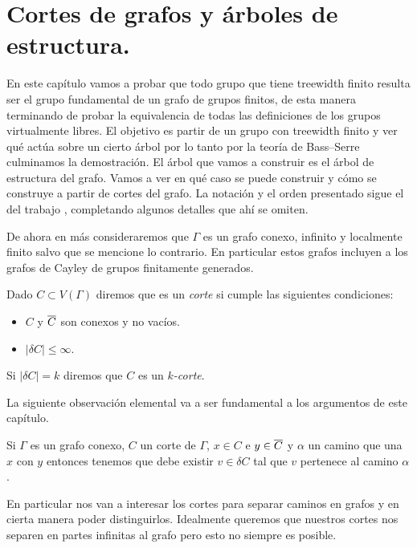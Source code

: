 \documentclass[tesis.tex]{subfiles}
\begin{document}
	
\chapter{Cortes de grafos y árboles de estructura.}

En este capítulo vamos a probar que todo grupo que tiene treewidth finito resulta ser el grupo fundamental de un grafo de grupos finitos, de esta manera terminando de probar la equivalencia de todas las definiciones de los grupos virtualmente libres.
El objetivo es partir de un grupo con treewidth finito y ver qué actúa sobre un cierto árbol por lo tanto por la teoría de Bass--Serre culminamos la demostración.
El árbol que vamos a construir es el árbol de estructura del grafo.
Vamos a ver en qué caso se puede construir y cómo se construye a partir de cortes del grafo. 
La notación y el orden presentado sigue el del trabajo \cite{diekert2013context}, completando algunos detalles que ahí se omiten.

De ahora en más consideraremos que $\Gamma$ es un grafo conexo, infinito y localmente finito salvo que se mencione lo contrario.
En particular estos grafos incluyen a los grafos de Cayley de grupos finitamente generados.

\begin{deff}
	Dado $C \subset V(\Gamma)$ diremos que es un \emph{corte} si cumple las siguientes condiciones:
	\begin{itemize}
		\item $C$ y $\overline C$ son conexos y no vacíos.
		\item $|\delta C| \le \infty$.
	\end{itemize}
	Si $|\delta C| = k$ diremos que $C$ es un \emph{$k$-corte}.
\end{deff}	


La siguiente observación elemental va a ser fundamental a los argumentos de este capítulo.

\begin{obs}\label{obs_camino_corte}
	Si $\Gamma$ es un grafo conexo, $C$ un corte de $\Gamma$, $x \in C$ e $y \in \overline C$ y 
	$\alpha$ un camino que una $x$ con $y$ 
	entonces tenemos que debe existir $v \in \delta C$ tal que $v$ pertenece al camino $\alpha$.
\end{obs} 


En particular nos van a interesar los cortes para separar caminos en grafos y en cierta manera poder distinguirlos.
Idealmente queremos que nuestros cortes nos separen en partes infinitas al grafo pero esto no siempre es posible.
\end{document}
